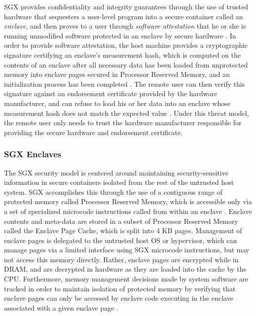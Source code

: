 SGX provides confidentiality and integrity guarantees through the use of trusted hardware that sequesters a user-level program into a secure container called an \emph{enclave}, and then proves to a user through \emph{software attestation} that he or she is running unmodified software protected in an enclave by secure hardware \cite{intel_corporation_intel_2016}. In order to provide software attestation, the host machine provides a cryptographic signature certifying an enclave's measurement hash, which is computed on the contents of an enclave after all necessary data has been loaded from unprotected memory into enclave pages secured in Processor Reserved Memory, and an initialization process has been completed \cite{costan_intel_2016}. The remote user can then verify this signature against an endorsement certificate provided by the hardware manufacturer, and can refuse to load his or her data into an enclave whose measurement hash does not match the expected value \cite{intel_corporation_intel_2016, costan_intel_2016}. Under this threat model, the remote user only needs to trust the hardware manufacturer responsible for providing the secure hardware and endorsement certificate.

\subsubsection{SGX Enclaves}

The SGX security model is centered around maintaining security-sensitive information in secure containers isolated from the rest of the untrusted host system. SGX accomplishes this through the use of a contiguous range of protected memory called Processor Reserved Memory, which is accessible only via a set of specialized microcode instructions called from within an enclave \cite{costan_intel_2016}. Enclave contents and meta-data are stored in a subset of Processor Reserved Memory called the Enclave Page Cache, which is split into 4 KB pages. Management of enclave pages is delegated to the untrusted host OS or hypervisor, which can manage pages via a limited interface using SGX microcode instructions, but may not access this memory directly. Rather, enclave pages are encrypted while in DRAM, and are decrypted in hardware as they are loaded into the cache by the CPU. Furthermore, memory management decisions made by system software are tracked in order to maintain isolation of protected memory by verifying that enclave pages can only be accessed by enclave code executing in the enclave associated with a given enclave page \cite{intel_corporation_intel_2016, costan_intel_2016, moghimi_cachezoom:_2017}. 

